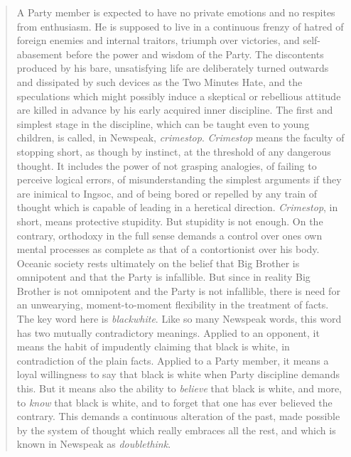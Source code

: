 \begin{paracol}{2}
\begin{quotation}
A Party member is expected to have no private emotions and no respites
from enthusiasm. He is supposed to live in a continuous frenzy of hatred
of foreign enemies and internal traitors, triumph over victories, and
self-abasement before the power and wisdom of the Party. The discontents
produced by his bare, unsatisfying life are deliberately turned outwards
and dissipated by such devices as the Two Minutes Hate, and the
speculations which might possibly induce a skeptical or rebellious
attitude are killed in advance by his early acquired inner discipline.
The first and simplest stage in the discipline, which can be taught even
to young children, is called, in Newspeak, \emph{crimestop}.
\emph{Crimestop} means the faculty of stopping short, as though by
instinct, at the threshold of any dangerous thought. It includes the
power of not grasping analogies, of failing to perceive logical errors,
of misunderstanding the simplest arguments if they are inimical to
Ingsoc, and of being bored or repelled by any train of thought which is
capable of leading in a heretical direction. \emph{Crimestop}, in short,
means protective stupidity. But stupidity is not enough. On the
contrary, orthodoxy in the full sense demands a control over
one\textquotesingle s own mental processes as complete as that of a
contortionist over his body. Oceanic society rests ultimately on the
belief that Big Brother is omnipotent and that the Party is infallible.
But since in reality Big Brother is not omnipotent and the Party is not
infallible, there is need for an unwearying, moment-to-moment
flexibility in the treatment of facts. The key word here is
\emph{blackwhite}. Like so many Newspeak words, this word has two
mutually contradictory meanings. Applied to an opponent, it means the
habit of impudently claiming that black is white, in contradiction of
the plain facts. Applied to a Party member, it means a loyal willingness
to say that black is white when Party discipline demands this. But it
means also the ability to \emph{believe} that black is white, and more,
to \emph{know} that black is white, and to forget that one has ever
believed the contrary. This demands a continuous alteration of the past,
made possible by the system of thought which really embraces all the
rest, and which is known in Newspeak as \emph{doublethink}.

\switchcolumn


\end{quotation}
\end{paracol}
